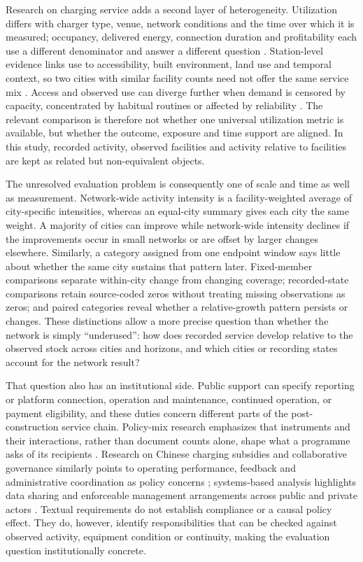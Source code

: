 Research on charging service adds a second layer of heterogeneity. Utilization differs with charger type, venue, network conditions and the time over which it is measured; occupancy, delivered energy, connection duration and profitability each use a different denominator and answer a different question \citep{borlaug2023,hecht2022,wolbertus2018}. Station-level evidence links use to accessibility, built environment, land use and temporal context, so two cities with similar facility counts need not offer the same service mix \citep{zhao2024_utilization,du2024_accessibility,zheng2025_landuse}. Access and observed use can diverge further when demand is censored by capacity, concentrated by habitual routines or affected by reliability \citep{huttel2023,weekx2024,weekx2025_habits,rempel2024,yu2025_reliability}. The relevant comparison is therefore not whether one universal utilization metric is available, but whether the outcome, exposure and time support are aligned. In this study, recorded activity, observed facilities and activity relative to facilities are kept as related but non-equivalent objects.

The unresolved evaluation problem is consequently one of scale and time as well as measurement. Network-wide activity intensity is a facility-weighted average of city-specific intensities, whereas an equal-city summary gives each city the same weight. A majority of cities can improve while network-wide intensity declines if the improvements occur in small networks or are offset by larger changes elsewhere. Similarly, a category assigned from one endpoint window says little about whether the same city sustains that pattern later. Fixed-member comparisons separate within-city change from changing coverage; recorded-state comparisons retain source-coded zeros without treating missing observations as zeros; and paired categories reveal whether a relative-growth pattern persists or changes. These distinctions allow a more precise question than whether the network is simply ``underused'': how does recorded service develop relative to the observed stock across cities and horizons, and which cities or recording states account for the network result?

That question also has an institutional side. Public support can specify reporting or platform connection, operation and maintenance, continued operation, or payment eligibility, and these duties concern different parts of the post-construction service chain. Policy-mix research emphasizes that instruments and their interactions, rather than document counts alone, shape what a programme asks of its recipients \citep{rogge2016}. Research on Chinese charging subsidies and collaborative governance similarly points to operating performance, feedback and administrative coordination as policy concerns \citep{hu2026,zhang2024,guo2026}; systems-based analysis highlights data sharing and enforceable management arrangements across public and private actors \citep{tilly2025}. Textual requirements do not establish compliance or a causal policy effect. They do, however, identify responsibilities that can be checked against observed activity, equipment condition or continuity, making the evaluation question institutionally concrete.

